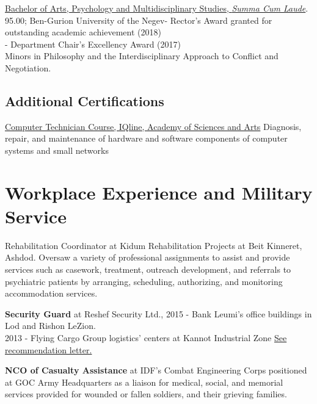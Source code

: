 {\href{https://www.dropbox.com/s/pcm0mybvgi85ma0/BA-Psych.pdf?dl=0}{Bachelor of Arts, Psychology and Multidisciplinary Studies, \textit{Summa Cum Laude}}. 95.00; Ben-Gurion University of the Negev}{- Rector's Award granted for outstanding academic achievement (2018) \\
- Department Chair’s Excellency Award (2017) \\
Minors in Philosophy and the Interdisciplinary Approach to Conflict and Negotiation.}

\subsection{Additional Certifications}
{\href{https://www.dropbox.com/s/csphxdynjdg3ze2/computer-technitian-certificate.jpg?dl=0}{Computer Technician Course, IQline, Academy of Sciences and Arts}}
{Diagnosis, repair, and maintenance of hardware and software components of computer systems and small networks}
{}

\section{Workplace Experience and Military Service}

{Rehabilitation Coordinator at Kidum Rehabilitation Projects at Beit Kinneret, Ashdod.}
{Oversaw a variety of professional assignments to assist and provide services such as casework, treatment, outreach development, and referrals to psychiatric patients by arranging, scheduling, authorizing, and monitoring accommodation services.}
{}

{\textbf{Security Guard} at Reshef Security Ltd.,} 
{2015 - Bank Leumi's office buildings in Lod and Rishon LeZion. \\
2013 - Flying Cargo Group logistics' centers at Kannot Industrial Zone}
{\href{https://www.dropbox.com/s/kr5rcui1zgp35i0/recommendation-letter-security-guard.jpg?dl=0}{See recommendation letter.}}

{\textbf{NCO of Casualty Assistance} at IDF's Combat Engineering Corps} 
{positioned at GOC Army Headquarters as a liaison for medical, social, and memorial services provided for wounded or fallen soldiers, and their grieving families.}
{}


